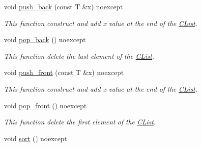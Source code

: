 \begin{DoxyCompactItemize}
\item 
void \hyperlink{classnsSdD_1_1CList_a4ea0f842488c5f564430e842ee648348}{push\+\_\+back} (const T \&x) noexcept
\begin{DoxyCompactList}\small\item\em This function construct and add {\ttfamily x} value at the end of the \hyperlink{classnsSdD_1_1CList}{C\+List}. \end{DoxyCompactList}\item 
\hypertarget{classnsSdD_1_1CList_a67071b474142b24a096da24db211de4b}{void \hyperlink{classnsSdD_1_1CList_a67071b474142b24a096da24db211de4b}{pop\+\_\+back} () noexcept}\label{classnsSdD_1_1CList_a67071b474142b24a096da24db211de4b}

\begin{DoxyCompactList}\small\item\em This function delete the last element of the \hyperlink{classnsSdD_1_1CList}{C\+List}. \end{DoxyCompactList}\item 
void \hyperlink{classnsSdD_1_1CList_a88394296072d50b2547dd843aa4a0069}{push\+\_\+front} (const T \&x) noexcept
\begin{DoxyCompactList}\small\item\em This function construct and add {\ttfamily x} value at the end of the \hyperlink{classnsSdD_1_1CList}{C\+List}. \end{DoxyCompactList}\item 
\hypertarget{classnsSdD_1_1CList_a16e16405d804c9f8c20c61a8acd45ece}{void \hyperlink{classnsSdD_1_1CList_a16e16405d804c9f8c20c61a8acd45ece}{pop\+\_\+front} () noexcept}\label{classnsSdD_1_1CList_a16e16405d804c9f8c20c61a8acd45ece}

\begin{DoxyCompactList}\small\item\em This function delete the first element of the \hyperlink{classnsSdD_1_1CList}{C\+List}. \end{DoxyCompactList}\item 
\hypertarget{classnsSdD_1_1CList_abea73e5cb037f3aab4b5626788ef5e0d}{void \hyperlink{classnsSdD_1_1CList_abea73e5cb037f3aab4b5626788ef5e0d}{sort} () noexcept}\label{classnsSdD_1_1CList_abea73e5cb037f3aab4b5626788ef5e0d}


\end{DoxyCompactItemize}
